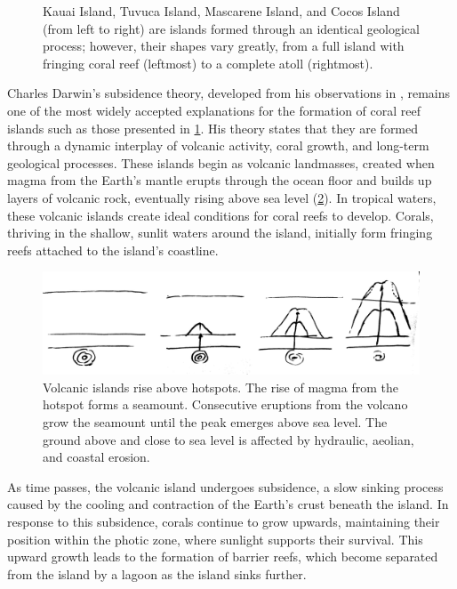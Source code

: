 \begin{figure}[H]
\caption{Kauai Island, Tuvuca Island, Mascarene Island, and Cocos Island (from left to right) are islands formed through an identical geological process; however, their shapes vary greatly, from a full island with fringing coral reef (leftmost) to a complete atoll (rightmost).}
\label{fig:coral-island-island-examples}
\end{figure}

Charles Darwin's subsidence theory, developed from his observations in \citep{Darwin1842}, remains one of the most widely accepted explanations for the formation of coral reef islands such as those presented in \cref{fig:coral-island-island-examples}. His theory states that they are formed through a dynamic interplay of volcanic activity, coral growth, and long-term geological processes. These islands begin as volcanic landmasses, created when magma from the Earth's mantle erupts through the ocean floor and builds up layers of volcanic rock, eventually rising above sea level (\cref{fig:coral-island-island-growth}). In tropical waters, these volcanic islands create ideal conditions for coral reefs to develop. Corals, thriving in the shallow, sunlit waters around the island, initially form fringing reefs attached to the island's coastline.

\begin{figure}
    \includegraphics[width = \linewidth]{other_images/Drawings/Volcano.jpg}
    \caption{Volcanic islands rise above hotspots. The rise of magma from the hotspot forms a seamount. Consecutive eruptions from the volcano grow the seamount until the peak emerges above sea level. The ground above and close to sea level is affected by hydraulic, aeolian, and coastal erosion.}
    \label{fig:coral-island-island-growth}
\end{figure}

As time passes, the volcanic island undergoes subsidence, a slow sinking process caused by the cooling and contraction of the Earth's crust beneath the island. In response to this subsidence, corals continue to grow upwards, maintaining their position within the photic zone, where sunlight supports their survival. This upward growth leads to the formation of barrier reefs, which become separated from the island by a lagoon as the island sinks further.

